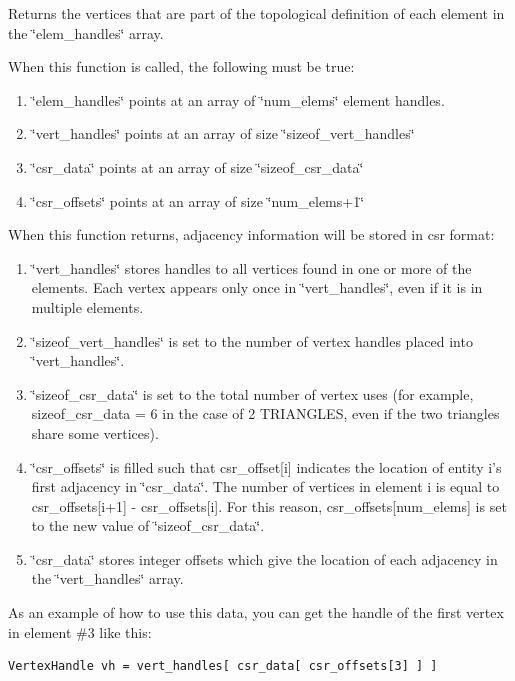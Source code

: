 \documentclass[letter]{report}
\begin{document}
Returns the vertices that are part of the topological definition of each element in the \char`\"{}elem\_\-handles\char`\"{} array.

When this function is called, the following must be true:\begin{enumerate}
\item 
\char`\"{}elem\_\-handles\char`\"{} points at an array of \char`\"{}num\_\-elems\char`\"{} element handles.\item 
\char`\"{}vert\_\-handles\char`\"{} points at an array of size \char`\"{}sizeof\_\-vert\_\-handles\char`\"{}\item 
\char`\"{}csr\_\-data\char`\"{} points at an array of size \char`\"{}sizeof\_\-csr\_\-data\char`\"{}\item 
\char`\"{}csr\_\-offsets\char`\"{} points at an array of size \char`\"{}num\_\-elems+1\char`\"{}\end{enumerate}
When this function returns, adjacency information will be stored in csr format:\begin{enumerate}
\item 
\char`\"{}vert\_\-handles\char`\"{} stores handles to all vertices found in one or more of the elements. Each vertex appears only once in \char`\"{}vert\_\-handles\char`\"{}, even if it is in multiple elements.\item 
\char`\"{}sizeof\_\-vert\_\-handles\char`\"{} is set to the number of vertex handles placed into \char`\"{}vert\_\-handles\char`\"{}.\item 
\char`\"{}sizeof\_\-csr\_\-data\char`\"{} is set to the total number of vertex uses (for example, sizeof\_\-csr\_\-data = 6 in the case of 2 TRIANGLES, even if the two triangles share some vertices).\item 
\char`\"{}csr\_\-offsets\char`\"{} is filled such that csr\_\-offset[i] indicates the location of entity i's first adjacency in \char`\"{}csr\_\-data\char`\"{}. The number of vertices in element i is equal to csr\_\-offsets[i+1] - csr\_\-offsets[i]. For this reason, csr\_\-offsets[num\_\-elems] is set to the new value of \char`\"{}sizeof\_\-csr\_\-data\char`\"{}.\item 
\char`\"{}csr\_\-data\char`\"{} stores integer offsets which give the location of each adjacency in the \char`\"{}vert\_\-handles\char`\"{} array.\end{enumerate}
As an example of how to use this data, you can get the handle of the first vertex in element \#3 like this: 

\footnotesize\begin{verbatim}VertexHandle vh = vert_handles[ csr_data[ csr_offsets[3] ] ] 
\end{verbatim}\normalsize 
\end{document}
